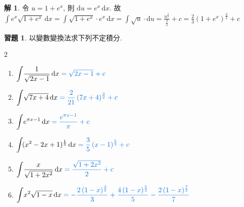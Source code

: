 \documentclass[12pt]{extarticle}
\newcommand{\ds}{\displaystyle}
\theoremstyle{definition}
\newtheorem*{sol}{解}
\newtheorem*{exe}{習題}
\begin{document}
\begin{sol}
  令 $u = 1 + e^x$, 則 $\ds\mathrm{d}u = e^x\,\mathrm{d}x$. 故 $\ds\int e^x\sqrt{1 + e^x}\,\mathrm{d}x = \int \sqrt{1 + e^x}\cdot e^x\,\mathrm{d}x = \int\!\sqrt{u}\cdot\mathrm{d}u = \frac{u^{\frac{3}{2}}}{\frac{3}{2}} + c = \frac{2}{3}(1 + e^x)^{\frac{3}{2}} + c$
\end{sol}

\begin{exe} 以變數變換法求下列不定積分. 
  \setlength{\columnsep}{-2cm}
  \begin{multicols}{2}
    \begin{enumerate}\setlength{\itemsep}{0pt}
      \item $\ds\int\!\frac{1}{\sqrt{2 x - 1}}\,\mathrm{d}x {\color{C2}\;= \sqrt{2x - 1} + c}$
      \item $\ds\int\!\sqrt{7x + 4}\,\mathrm{d}x {\color{C2}\;= \frac{2}{21}\,(7x + 4)^{\frac{3}{2}} + c}$
      \item $\ds\int\!e^{\pi x - 1}\,\mathrm{d}x {\color{C2}\;= \frac{e^{\pi x - 1}}{\pi} + c}$
      \item $\ds\int\!(x^2 - 2x + 1)^{\frac{1}{3}}\,\mathrm{d}x {\color{C2}\;= \frac{3}{5}\,(x - 1)^{\frac{5}{3}} + c}$
      \item $\ds\int\!\frac{x}{\sqrt{1 + 2x^2}}\,\mathrm{d}x {\color{C2}\;= \frac{\sqrt{1 + 2x^2}}{2} + c}$
      \item $\ds\int\!x^2\sqrt{1 - x}\,\mathrm{d}x {\color{C2}\;= -\frac{2\,(1 - x)^{\frac{3}{2}}}{3} + \frac{4\,(1 - x)^{\frac{5}{2}}}{5} - \frac{2\,(1 - x)^{\frac{7}{2}}}{7}}$
    \end{enumerate} 
  \end{multicols}
\end{exe}
\end{document}
